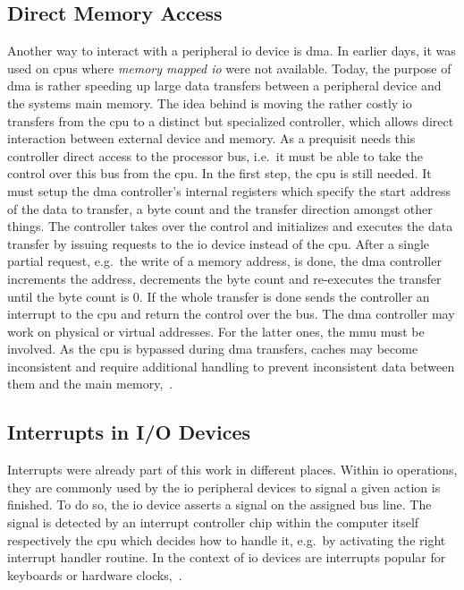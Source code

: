 \subsection{Direct Memory Access}
Another way to interact with a peripheral \ac{io} device is \acf{dma}.
In earlier days, it was used on \acp{cpu} where \textit{memory mapped \ac{io}} were not available.
Today, the purpose of \ac{dma} is rather speeding up large data transfers between a peripheral device and the systems main memory.
The idea behind is moving the rather costly \ac{io} transfers from the \ac{cpu} to a distinct but specialized controller, which allows direct interaction between external device and memory.
As a prequisit needs this controller direct access to the processor bus, i.e.\ it must be able to take the control over this bus from the \ac{cpu}.
In the first step, the \ac{cpu} is still needed.
It must setup the \ac{dma} controller's internal registers which specify the start address of the data to transfer, a byte count and the transfer direction amongst other things.
The controller takes over the control and initializes and executes the data transfer by issuing requests to the \ac{io} device instead of the \ac{cpu}.
After a single partial request, e.g.\ the write of a memory address, is done, the \ac{dma} controller increments the address, decrements the byte count and re-executes the transfer until the byte count is 0.
If the whole transfer is done sends the controller an interrupt to the \ac{cpu} and return the control over the bus.
The \ac{dma} controller may work on physical or virtual addresses.
For the latter ones, the \ac{mmu} must be involved.
As the \ac{cpu} is bypassed during \ac{dma} transfers, caches may become inconsistent and require additional handling to prevent inconsistent data between them and the main memory\cite{tanenbaum-modern-operating-systems},~\cite{glatz2015betriebssysteme}.

\subsection{Interrupts in I/O Devices}
Interrupts were already part of this work in different places.
Within \ac{io} operations, they are commonly used by the \ac{io} peripheral devices to signal a given action is finished.
To do so, the \ac{io} device asserts a signal on the assigned bus line.
The signal is detected by an interrupt controller chip within the computer itself respectively the \ac{cpu} which decides how to handle it, e.g.\ by activating the right interrupt handler routine.
In the context of \ac{io} devices are interrupts popular for keyboards or hardware clocks\cite{tanenbaum-modern-operating-systems},~\cite{glatz2015betriebssysteme}.



